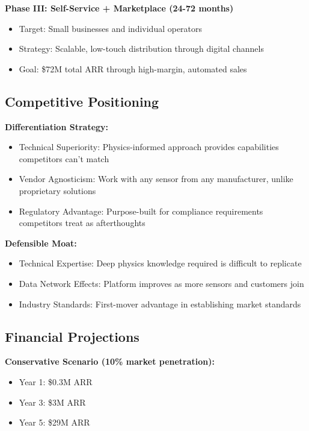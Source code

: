 \documentclass[11pt,letterpaper]{article}
\begin{document}
\textbf{Phase III: Self-Service + Marketplace (24-72 months)}
\begin{itemize}[leftmargin=10pt, itemsep=1pt]
    \item Target: Small businesses and individual operators
    \item Strategy: Scalable, low-touch distribution through digital channels
    \item Goal: \$72M total ARR through high-margin, automated sales
\end{itemize}

\subsection*{Competitive Positioning}

\textbf{Differentiation Strategy:}
\begin{itemize}[leftmargin=10pt, itemsep=1pt]
    \item Technical Superiority: Physics-informed approach provides capabilities competitors can't match
    \item Vendor Agnosticism: Work with any sensor from any manufacturer, unlike proprietary solutions
    \item Regulatory Advantage: Purpose-built for compliance requirements competitors treat as afterthoughts
\end{itemize}

\textbf{Defensible Moat:}
\begin{itemize}[leftmargin=10pt, itemsep=1pt]
    \item Technical Expertise: Deep physics knowledge required is difficult to replicate
    \item Data Network Effects: Platform improves as more sensors and customers join
    \item Industry Standards: First-mover advantage in establishing market standards
\end{itemize}

\subsection*{Financial Projections}

\textbf{Conservative Scenario (10\% market penetration):}
\begin{itemize}[leftmargin=10pt, itemsep=1pt]
    \item Year 1: \$0.3M ARR
    \item Year 3: \$3M ARR
    \item Year 5: \$29M ARR
\end{itemize}
\end{document}
